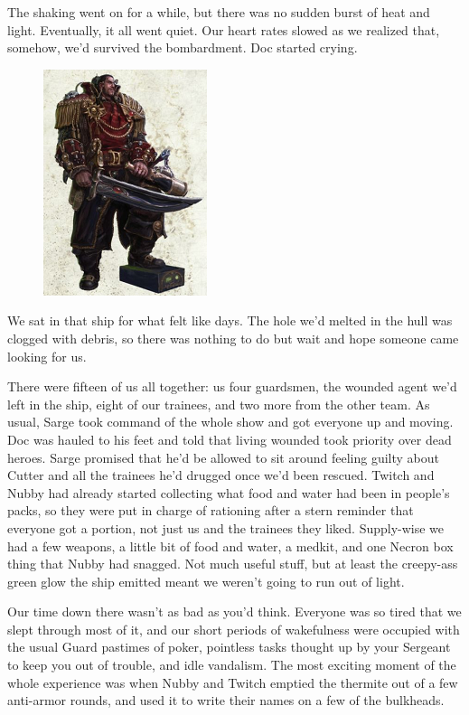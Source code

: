 The shaking went on for a while, but there was no sudden burst of heat and light. 
Eventually, it all went quiet. 
Our heart rates slowed as we realized that, somehow, we’d survived the bombardment. 
Doc started crying.

\begin{figure}
	\begin{center}
		\includegraphics[width=\figwidth]{pics/8/59.png}
	\end{center}
\end{figure}
We sat in that ship for what felt like days. 
The hole we’d melted in the hull was clogged with debris, so there was nothing to do but wait and hope someone came looking for us.

There were fifteen of us all together: 
us four guardsmen, the wounded agent we’d left in the ship, eight of our trainees, and two more from the other team. 
As usual, Sarge took command of the whole show and got everyone up and moving. 
Doc was hauled to his feet and told that living wounded  took priority over dead heroes. 
Sarge promised that he’d be allowed to sit around feeling guilty about Cutter and all the trainees he’d drugged once we’d been rescued. 
Twitch and Nubby had already started collecting what food and water had been in people's packs, so they were put in charge of rationing after a stern reminder that everyone got a portion, not just us and the trainees they liked. 
Supply-wise we had a few weapons, a little bit of food and water, a medkit, and one Necron box thing that Nubby had snagged. 
Not much useful stuff, but at least the creepy-ass green glow the ship emitted meant we weren’t going to run out of light.

Our time down there wasn’t as bad as you’d think. 
Everyone was so tired that we slept through most of it, and our short periods of wakefulness were occupied with the usual Guard pastimes of poker, pointless tasks thought up by your Sergeant to keep you out of trouble, and idle vandalism. 
The most exciting moment of the whole experience was when Nubby and Twitch emptied the thermite out of a few anti-armor rounds, and used it to write their names on a few of the bulkheads.

